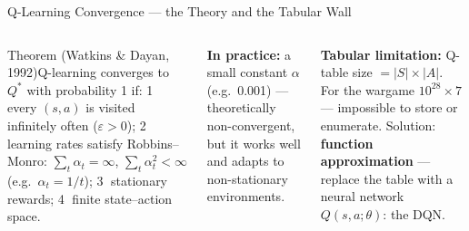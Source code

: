 \documentclass[aspectratio=169,10pt,t]{beamer}
\begin{document}
\begin{frame}{Q-Learning Convergence --- the Theory and the Tabular Wall}
\begin{columns}[T]
\begin{cbox}{Theorem (Watkins \& Dayan, 1992)}\scriptsize Q-learning converges to $Q^{*}$ with probability 1 if: \textcircled{\tiny1} every $(s,a)$ is visited infinitely often ($\varepsilon>0$); \textcircled{\tiny2} learning rates satisfy Robbins--Monro: $\sum_t\alpha_t=\infty$, $\sum_t\alpha_t^2<\infty$ (e.g.\ $\alpha_t=1/t$); \textcircled{\tiny3} stationary rewards; \textcircled{\tiny4} finite state--action space.\end{cbox}
\begin{ibox}\scriptsize\textbf{In practice:} a small constant $\alpha$ (e.g.\ 0.001) --- theoretically non-convergent, but it works well and adapts to non-stationary environments.\end{ibox}
\begin{wbox}\scriptsize\textbf{Tabular limitation:} Q-table size $=|S|\times|A|$. For the wargame $10^{28}\times7$ --- impossible to store or enumerate. Solution: \textbf{function approximation} --- replace the table with a neural network $Q(s,a;\theta)$: the DQN.\end{wbox}
\end{columns}
\end{frame}
\end{document}
